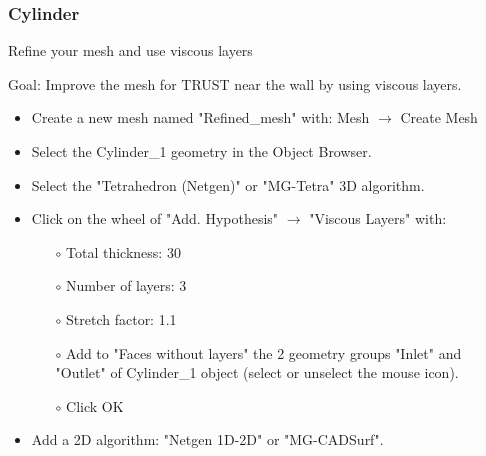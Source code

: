 \documentclass[10pt, hyperref={unicode=true,pdfusetitle, bookmarks=true,bookmarksnumbered=false,bookmarksopen=false, breaklinks=false,pdfborder={0 0 1},backref=true,colorlinks=true,linkcolor=darkblue,pageanchor}]{beamer}
\begin{document}
\begin{frame}
\frametitle{Cylinder}
\begin{block}{Refine your mesh and use viscous layers}

Goal: Improve the mesh for TRUST near the wall by using viscous layers.

\begin{itemize}
\item Create a new mesh named "Refined\_mesh" with: Mesh $\rightarrow$ Create Mesh

\item Select the Cylinder\_1 geometry in the Object Browser.

\item Select the "Tetrahedron (Netgen)" or "MG-Tetra" 3D algorithm.

\item Click on the wheel of "Add. Hypothesis" $\rightarrow$ "Viscous Layers" with:
    \begin{itemize}
    \item [$\circ$] Total thickness: 30
    \item [$\circ$] Number of layers: 3
    \item [$\circ$] Stretch factor: 1.1
    \item [$\circ$] Add to "Faces without layers" the 2 geometry groups "Inlet" and "Outlet" of Cylinder\_1 object (select or unselect the mouse icon).
    \item [$\circ$] Click OK
    \end{itemize}

\item Add a 2D algorithm: "Netgen 1D-2D" or "MG-CADSurf".
\end{itemize}

\end{block}
\end{frame}
\end{document}
